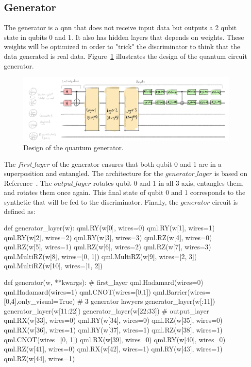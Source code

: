 \subsection{Generator}
\label{sec:gen}

The generator is a \gls{qnn} that does not receive input data but outputs a 2 
qubit state in qubits 0 and 1. It also has hidden layers that depends on weights.
These weights will be optimized in order to "trick" the discriminator to think 
that the data generated is real data. Figure~\ref{fig:gen} illustrates the 
design of the quantum circuit generator.

\begin{figure}[!htbp]
\centering
    \includegraphics[width=1\textwidth]{figures/generator.pdf}
\caption{Design of the quantum generator.}
\label{fig:gen}
\end{figure}


The $first\_layer$ of the generator ensures that both qubit 0 and 1 are in a 
superposition and entangled. The architecture for the $generator\_layer$ is based 
on Reference~\cite{generator}. The $output\_layer$ rotates qubit 0 and 1 in all 
3 axis, entangles them, and rotates them once again. This final state of qubit 0 
and 1 corresponds to the synthetic that will be fed to the discriminator. 
Finally, the $generator$ circuit is defined as:
\begin{python}
def generator_layer(w):
    qml.RY(w[0], wires=0)
    qml.RY(w[1], wires=1)
    qml.RY(w[2], wires=2)
    qml.RY(w[3], wires=3)
    qml.RZ(w[4], wires=0)
    qml.RZ(w[5], wires=1)
    qml.RZ(w[6], wires=2)
    qml.RZ(w[7], wires=3)
    qml.MultiRZ(w[8], wires=[0, 1])
    qml.MultiRZ(w[9], wires=[2, 3])
    qml.MultiRZ(w[10], wires=[1, 2])

def generator(w, **kwargs):
    # first_layer
    qml.Hadamard(wires=0)
    qml.Hadamard(wires=1)
    qml.CNOT(wires=[0,1])
    qml.Barrier(wires=[0,4],only_visual=True)
    # 3 generator lawyers
    generator_layer(w[:11])
    generator_layer(w[11:22])
    generator_layer(w[22:33])
    # output_layer
    qml.RX(w[33], wires=0)
    qml.RY(w[34], wires=0)
    qml.RZ(w[35], wires=0)
    qml.RX(w[36], wires=1)
    qml.RY(w[37], wires=1)
    qml.RZ(w[38], wires=1)
    qml.CNOT(wires=[0, 1])
    qml.RX(w[39], wires=0)
    qml.RY(w[40], wires=0)
    qml.RZ(w[41], wires=0)
    qml.RX(w[42], wires=1)
    qml.RY(w[43], wires=1)
    qml.RZ(w[44], wires=1)
\end{python}

